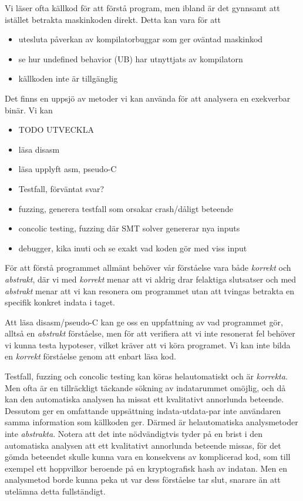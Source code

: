 
Vi läser ofta källkod för att förstå program, men ibland är det gynnsamt att istället betrakta
maskinkoden direkt. Detta kan vara för att
\begin{itemize}
  \item utesluta påverkan av kompilatorbuggar som ger oväntad maskinkod
  \item se hur undefined behavior (UB) har utnyttjats av kompilatorn
  \item källkoden inte är tillgänglig
\end{itemize}

Det finns en uppsjö av metoder vi kan använda för att analysera en exekverbar binär. Vi kan
\begin{itemize}
  \item TODO UTVECKLA
  \item läsa disasm
  \item läsa upplyft asm, pseudo-C
  \item Testfall, förväntat svar?
  \item fuzzing, generera testfall som orsakar crash/dåligt beteende
  \item concolic testing, fuzzing där SMT solver genererar nya inputs
  \item debugger, kika inuti och se exakt vad koden gör med viss input
\end{itemize}

För att förstå programmet allmänt behöver vår förståelse vara både \textit{korrekt} och
\textit{abstrakt}, där vi med \textit{korrekt} menar att vi aldrig drar felaktiga slutsatser och med
\textit{abstrakt} menar att vi kan resonera om programmet utan att tvingas betrakta en specifik
konkret indata i taget.

Att läsa disasm/pseudo-C kan ge oss en uppfattning av vad programmet gör, alltså en
\textit{abstrakt} förståelse, men för att verifiera att vi inte resonerat fel behöver vi kunna testa
hypoteser, vilket kräver att vi köra programet. Vi kan inte bilda en \textit{korrekt} förståelse
genom att enbart läsa kod.

Testfall, fuzzing och concolic testing kan köras helautomatiskt och är \textit{korrekta}. Men ofta
är en tillräckligt täckande sökning av indatarummet omöjlig, och då kan den automatiska analysen ha
missat ett kvalitativt annorlunda beteende. Dessutom ger en omfattande uppsättning indata-utdata-par
inte användaren samma information som källkoden ger. Därmed är helautomatiska analysmetoder inte
\textit{abstrakta}. Notera att det inte nödvändigtvis tyder på en brist i den automatiska analysen
att ett kvalitativt annorlunda beteende missas, för det gömda beteendet skulle kunna vara en
konsekvens av komplicerad kod, som till exempel ett hoppvilkor beroende på en kryptografisk hash av
indatan. Men en analysmetod borde kunna peka ut var dess förståelse tar slut, snarare än att
utelämna detta fullständigt.

